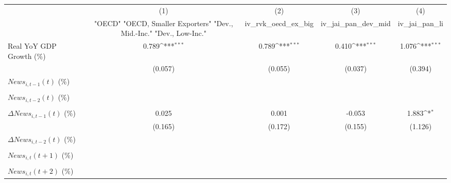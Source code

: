 {
\def\sym#1{\ifmmode^{#1}\else\(^{#1}\)\fi}
\begin{tabular}{l*{4}{c}}
\toprule
                    &\multicolumn{1}{c}{(1)}&\multicolumn{1}{c}{(2)}&\multicolumn{1}{c}{(3)}&\multicolumn{1}{c}{(4)}\\
                    &\multicolumn{1}{c}{ "OECD" "OECD, Smaller Exporters" "Dev., Mid.-Inc." "Dev., Low-Inc."}&\multicolumn{1}{c}{iv_rvk_oecd_ex_big}&\multicolumn{1}{c}{iv_jai_pan_dev_mid}&\multicolumn{1}{c}{iv_jai_pan_li}\\
\midrule
Real YoY GDP Growth (\%)&       0.789\sym{***}&       0.789\sym{***}&       0.410\sym{***}&       1.076\sym{***}\\
                    &     (0.057)         &     (0.055)         &     (0.037)         &     (0.394)         \\
\addlinespace
$ News_{i,t-1}(t)$ (\%)&                     &                     &                     &                     \\
                    &                     &                     &                     &                     \\
\addlinespace
$ News_{i,t-2}(t)$ (\%)&                     &                     &                     &                     \\
                    &                     &                     &                     &                     \\
\addlinespace
$ \Delta News_{i,t-1}(t)$ (\%)&       0.025         &       0.001         &      -0.053         &       1.883\sym{*}  \\
                    &     (0.165)         &     (0.172)         &     (0.155)         &     (1.126)         \\
\addlinespace
$ \Delta News_{i,t-2}(t)$ (\%)&                     &                     &                     &                     \\
                    &                     &                     &                     &                     \\
\addlinespace
$ News_{i,t}(t+1)$ (\%)&                     &                     &                     &                     \\
                    &                     &                     &                     &                     \\
\addlinespace
$ News_{i,t}(t+2)$ (\%)&                     &                     &                     &                     \\

\end{tabular}}

